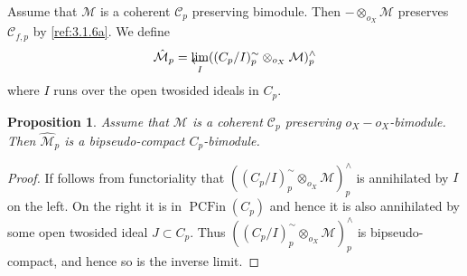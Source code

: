 \documentclass{amsproc}
\def\Cscr{{\mathcal C}}
\def\Mscr{{\mathcal M}}
\let\invlim\projlim
\DeclareMathOperator{\PCFin}{PCFin}
\newtheorem{propositions}[lemmas]{Proposition}
\theoremstyle{definition}
\theoremstyle{remark}
\def\invlim{\mathop{\vtop{\baselineskip -100pt\lineskip -1pt\lineskiplimit 0pt
\setbox0\hbox{\upshape lim}\copy0\hbox to \wd0{\leftarrowfill}}}\limits}
\numberwithin{equation}{section}
\numberwithin{table}{section}
\numberwithin{figure}{section}
\begin{document}
Assume that $\Mscr$ is a coherent $\Cscr_{p}$ preserving bimodule. Then
$-\otimes_{o_X} \Mscr$ preserves $\Cscr_{f,p}$ by \ref{ref:3.1.6a}.
We define
\begin{equation}
\label{ref:5.18a}
\hat{\Mscr}_{p}=\invlim_I ((C_p/I)^\sim_{p}\otimes_{o_X}
\Mscr)^\wedge_{p}
\end{equation}
where $I$  runs over the  open twosided ideals in $C_p$.
\begin{propositions} 
\label{ref:5.4.2a}
Assume that $\Mscr$ is a coherent $\Cscr_{p}$
preserving $o_X-o_X$-bimodule. Then
$\hat{\Mscr}_{p}$ is a bipseudo-compact $C_p$-bimodule.
\end{propositions}
\begin{proof}
  If follows from functoriality that $((C_p/I)^\sim_{p}\otimes_{o_X}
  \Mscr)^\wedge_{p}$ is annihilated by $I$ on the left.  On the right
  it is in $\PCFin(C_p)$ and hence it is also annihilated by some open
  twosided ideal $J\subset C_p$. Thus $((C_p/I)^\sim_{p}\otimes_{o_X}
  \Mscr)^\wedge_{p}$ is bipseudo-compact, and hence so is the inverse
  limit.
\end{proof}
\end{document}
